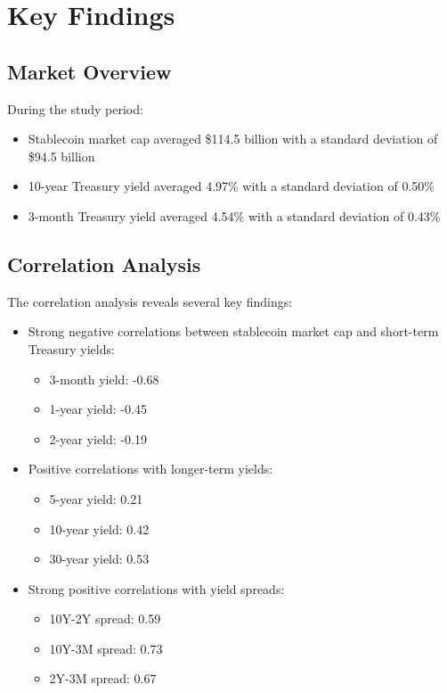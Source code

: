 \documentclass[12pt,a4paper]{article}
\begin{document}
\section{Key Findings}

\subsection{Market Overview}
During the study period:
\begin{itemize}
    \item Stablecoin market cap averaged \$114.5 billion with a standard deviation of \$94.5 billion
    \item 10-year Treasury yield averaged 4.97\% with a standard deviation of 0.50\%
    \item 3-month Treasury yield averaged 4.54\% with a standard deviation of 0.43\%
\end{itemize}

\subsection{Correlation Analysis}
The correlation analysis reveals several key findings:
\begin{itemize}
    \item Strong negative correlations between stablecoin market cap and short-term Treasury yields:
    \begin{itemize}
        \item 3-month yield: -0.68
        \item 1-year yield: -0.45
        \item 2-year yield: -0.19
    \end{itemize}
    \item Positive correlations with longer-term yields:
    \begin{itemize}
        \item 5-year yield: 0.21
        \item 10-year yield: 0.42
        \item 30-year yield: 0.53
    \end{itemize}
    \item Strong positive correlations with yield spreads:
    \begin{itemize}
        \item 10Y-2Y spread: 0.59
        \item 10Y-3M spread: 0.73
        \item 2Y-3M spread: 0.67
    \end{itemize}
\end{itemize}
\end{document}
